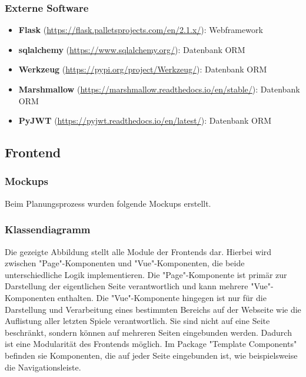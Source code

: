 \subsubsection{Externe Software}
\begin{itemize}
\item \textbf{Flask} (\href{https://flask.palletsprojects.com/en/2.1.x/}{https://flask.palletsprojects.com/en/2.1.x/}): Webframework
\item \textbf{sqlalchemy} (\href{https://www.sqlalchemy.org/}{https://www.sqlalchemy.org/}): Datenbank ORM
\item \textbf{Werkzeug} (\href{https://pypi.org/project/Werkzeug/}{https://pypi.org/project/Werkzeug/}): Datenbank ORM
\item \textbf{Marshmallow} (\href{https://marshmallow.readthedocs.io/en/stable/}{https://marshmallow.readthedocs.io/en/stable/}): Datenbank ORM
\item \textbf{PyJWT} (\href{https://pyjwt.readthedocs.io/en/latest/}{https://pyjwt.readthedocs.io/en/latest/}): Datenbank ORM
\end{itemize}

\newpage

\subsection{Frontend}

\subsubsection{Mockups}

Beim Planungsprozess wurden folgende Mockups erstellt.


\subsubsection{Klassendiagramm}


Die gezeigte Abbildung stellt alle Module der Frontends dar. Hierbei wird zwischen "Page"-Komponenten und "Vue"-Komponenten, die beide unterschiedliche Logik implementieren.
Die "Page"-Komponente ist primär zur Darstellung der eigentlichen Seite verantwortlich und kann mehrere "Vue"-Komponenten enthalten.
Die "Vue"-Komponente hingegen ist nur für die Darstellung und Verarbeitung eines bestimmten Bereichs auf der Webseite wie die Auflistung aller letzten Spiele verantwortlich.
Sie sind nicht auf eine Seite beschränkt, sondern können auf mehreren Seiten eingebunden werden. Dadurch ist eine Modularität des Frontends möglich.
Im Package "Template Components" befinden sie Komponenten, die auf jeder Seite eingebunden ist, wie beispielsweise die Navigationsleiste.

